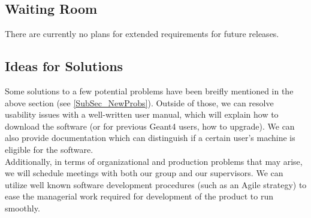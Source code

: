 \documentclass[12pt]{article}
\begin{document}
\subsection{Waiting Room} %
There are currently no plans for extended requirements for future releases.

\subsection{Ideas for Solutions} %
Some solutions to a few potential problems have been breifly mentioned in the above section (see \ref{SubSec_NewProbs}). Outside of those, we can resolve usability issues with a well-written user manual, which will explain how to download the software (or for previous Geant4 users, how to upgrade). We can also provide documentation which can distinguish if a certain user's machine is eligible for the software. \\
Additionally, in terms of organizational and production problems that may arise, we will schedule meetings with both our group and our supervisors. We can utilize well known software development procedures (such as an Agile strategy) to ease the managerial work required for development of the product to run smoothly.\\
\end{document}
